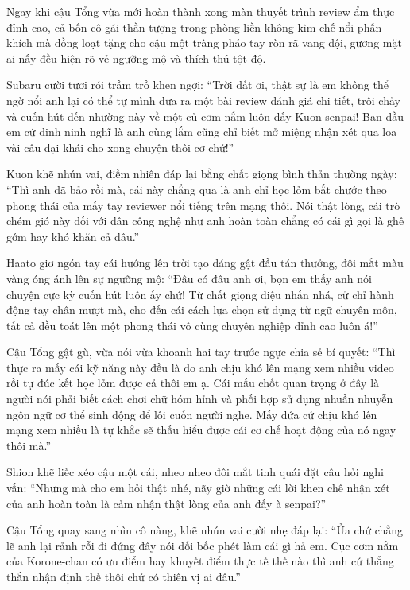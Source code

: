 \documentclass[../main.tex]{subfiles}
\begin{document}
Ngay khi cậu Tổng vừa mới hoàn thành xong màn thuyết trình review ẩm thực đỉnh cao, cả bốn cô gái thần tượng trong phòng liền không kìm chế nổi phấn khích mà đồng loạt tặng cho cậu một tràng pháo tay ròn rã vang dội, gương mặt ai nấy đều hiện rõ vẻ ngưỡng mộ và thích thú tột độ.

Subaru cười tươi rói trầm trồ khen ngợi: ``Trời đất ơi, thật sự là em không thể ngờ nổi anh lại có thể tự mình đưa ra một bài review đánh giá chi tiết, trôi chảy và cuốn hút đến nhường này về một củ cơm nắm luôn đấy Kuon-senpai! Ban đầu em cứ đinh ninh nghĩ là anh cùng lắm cũng chỉ biết mở miệng nhận xét qua loa vài câu đại khái cho xong chuyện thôi cơ chứ!''

Kuon khẽ nhún vai, điềm nhiên đáp lại bằng chất giọng bình thản thường ngày: ``Thì anh đã bảo rồi mà, cái này chẳng qua là anh chỉ học lỏm bắt chước theo phong thái của mấy tay reviewer nổi tiếng trên mạng thôi. Nói thật lòng, cái trò chém gió này đối với dân công nghệ như anh hoàn toàn chẳng có cái gì gọi là ghê gớm hay khó khăn cả đâu.''

Haato giơ ngón tay cái hướng lên trời tạo dáng gật đầu tán thưởng, đôi mắt màu vàng óng ánh lên sự ngưỡng mộ: ``Đâu có đâu anh ơi, bọn em thấy anh nói chuyện cực kỳ cuốn hút luôn ấy chứ! Từ chất giọng điệu nhấn nhá, cử chỉ hành động tay chân mượt mà, cho đến cái cách lựa chọn sử dụng từ ngữ chuyên môn, tất cả đều toát lên một phong thái vô cùng chuyên nghiệp đỉnh cao luôn á!''

Cậu Tổng gật gù, vừa nói vừa khoanh hai tay trước ngực chia sẻ bí quyết: ``Thì thực ra mấy cái kỹ năng này đều là do anh chịu khó lên mạng xem nhiều video rồi tự đúc kết học lỏm được cả thôi em ạ. Cái mấu chốt quan trọng ở đây là người nói phải biết cách chơi chữ hóm hỉnh và phối hợp sử dụng nhuần nhuyễn ngôn ngữ cơ thể sinh động để lôi cuốn người nghe. Mấy đứa cứ chịu khó lên mạng xem nhiều là tự khắc sẽ thấu hiểu được cái cơ chế hoạt động của nó ngay thôi mà.''

Shion khẽ liếc xéo cậu một cái, nheo nheo đôi mắt tinh quái đặt câu hỏi nghi vấn: ``Nhưng mà cho em hỏi thật nhé, nãy giờ những cái lời khen chê nhận xét của anh hoàn toàn là cảm nhận thật lòng của anh đấy à senpai?''

Cậu Tổng quay sang nhìn cô nàng, khẽ nhún vai cười nhẹ đáp lại: ``Ủa chứ chẳng lẽ anh lại rảnh rỗi đi đứng đây nói dối bốc phét làm cái gì hả em. Cục cơm nắm của Korone-chan có ưu điểm hay khuyết điểm thực tế thế nào thì anh cứ thẳng thắn nhận định thế thôi chứ có thiên vị ai đâu.''
\end{document}
